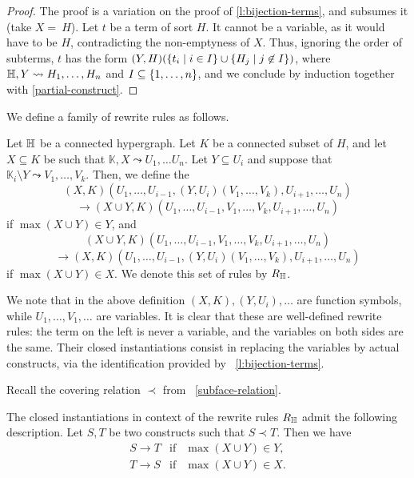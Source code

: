 \begin{proof}
The proof is a variation on the proof of \cref{l:bijection-terms}, and subsumes it (take $X=~H$).  
Let $t$ be a term  of  sort $H$. 
It cannot be a variable, as it would have to be $H$, contradicting the non-emptyness of $X$. 
Thus, ignoring the order of subterms, $t$ has the form $(Y,H)(\left\{t_i \mid i\in I\right\}\cup\left\{H_j \mid j\not\in I\right\})$, where ${\mathbb H},Y \leadsto H_1,\ldots,H_n$ and $I\subseteq\left\{1,\ldots,n\right\}$, and we conclude by induction together with \cref{partial-construct}.
\end{proof}

We define a family of rewrite rules as follows.

\begin{definition} \label{def:rules}
  Let ${\mathbb H}$ be a connected hypergraph. 
  Let $K$ be a connected subset of $H$, and let $X \subseteq K$ be such that $\mathbb{K},X \leadsto U_1,\ldots U_n$.
  Let $Y \subseteq U_i$ and suppose that $\mathbb{K}_i\setminus Y \leadsto V_1,\ldots, V_k$. 
  Then, we define the 
  $$(X,K)(U_1,\ldots, U_{i-1},(Y,U_i)(V_1,\ldots, V_k),U_{i+1},\ldots,U_n)$$
  $$ \longrightarrow (X\cup Y,K)(U_1,\ldots,U_{i-1},V_1,\ldots, V_k,U_{i+1},\ldots,U_n)$$
  if $\max(X\cup Y)\in Y$, and 
  $$(X\cup Y,K)(U_1,\ldots,U_{i-1},V_1,\ldots, V_k,U_{i+1},\ldots,U_n)$$
  $$\longrightarrow (X,K)(U_1,\ldots, U_{i-1},(Y,U_i)(V_1,\ldots, V_k),U_{i+1},\ldots,U_n)$$
  if $\max(X\cup Y)\in X$.
  We denote this set of rules by $R_{\mathbb H}$.
\end{definition} 
We note that in the above definition $(X,K), (Y,U_i),\ldots$ are function symbols, while $U_1,\ldots,V_1,\ldots$ are variables.
It is clear that these are well-defined rewrite rules: the term on the left is never a variable, and the variables on both sides are the same.
Their closed instantiations consist in replacing the variables by actual constructs, via the identification provided by~ \cref{l:bijection-terms}.

Recall the covering relation $\prec$ from~ \cref{subface-relation}.
\begin{lemma} 
  The closed instantiations in context of the rewrite rules $R_{\mathbb H}$ admit the following description.
  Let $S,T$ be two constructs such that $S \prec T$.  Then we have
  $$\begin{array}{lll}
    S \to T &  \mathrm{if} & \max(X\cup Y)\in Y, \\
    T \to S & \mathrm{if} & \max(X\cup Y)\in X.
  \end{array}$$
\end{lemma} 

